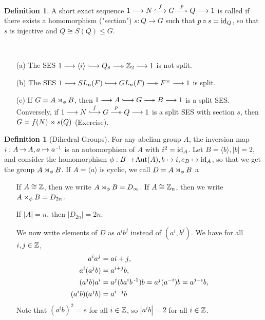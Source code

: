 \documentclass[11pt]{book}
\theoremstyle{definition}   \newtheorem{defn}[counter]{Definition} %
\newcommand{\gen}[1]{\langle #1 \rangle}   \newcommand{\stab}[2]{\tn{Stab}_{#1}(#2)}   \newcommand{\fix}[2]{\tn{Fix}_{#1}(#2)}
\newcommand{\hooklongrightarrow}{\lhook\joinrel\longrightarrow}   \newcommand{\twoheadlongrightarrow}{\relbar\joinrel\twoheadrightarrow}
\newcommand{\ses}[5]{1 \longrightarrow #1 \overset{#2}{\hooklongrightarrow} #3 \overset{#4}{\twoheadlongrightarrow} #5 \longrightarrow 1}
\DeclareMathOperator{\ra}{\rightarrow}   \DeclareMathOperator{\Poly}{\mathbf{P}}   \DeclareMathOperator{\spn}{\textnormal{span}}   \DeclareMathOperator{\aut}{\textnormal{Aut}}
\newcommand{\vs}{\vspace{8pt}}
\numberwithin{counter}{chapter}
\begin{document}
\vs

\begin{defn}
A short exact sequence $\ses{N}{f}{G}{p}{Q}$ is called  if there exists a homomorphism ("section") $s : Q \ra G$ such that $p \circ s = \textnormal{id}_Q$, so that $s$ is injective and $Q \cong S(Q) \leq G$.
\end{defn}

\vs

\begin{example*}
\
\begin{enumerate}
\item[(a)] The SES $\ses{\gen{i}}{}{Q_8}{}{\z_2}$ is not split.
\item[(b)] The SES $\ses{SL_n(F)}{}{GL_n(F)}{}{F\x}$ is split.
\item[(c)] If $G = A \rtimes_{\phi} B$, then $\ses{A}{}{G}{}{B}$ is a split SES. Conversely, if $\ses{N}{f}{G}{p}{Q}$ is a split SES with section $s$, then $G = f(N) \rtimes_{} s(Q)$ (Exercise).
\end{enumerate}
\end{example*}

\vs

\begin{defn}[Dihedral Groups]
For any abelian group $A$, the inversion map $i : A \ra A, a \mapsto a\inv$ is an automorphism of $A$ with $i^2 = \textnormal{id}_A$. Let $B = \gen{b}, |b|=2$, and consider the homomorphism $\phi : B \ra \aut(A), b \mapsto i, e_B \mapsto \id_A$, so that we get the group $A \rtimes_{\phi} B$. If $A = \gen{a}$ is cyclic, we call $D = A \rtimes_{\phi}B$ a 
\begin{enumerate}
\item[\tb{Notation.}] If $A \cong \operatorname{\mathbb{Z}}$, then we write $A \rtimes_{\phi}B = D_\infty$. If $A \cong \operatorname{\mathbb{Z}}_n$, then we write $A \rtimes_{\phi}B = D_{2n}$.
\item[\tb{Elements.}] If $|A| = n$, then $|D_{2n}| = 2n$.
\item[\tb{Multiplication.}] We now write elements of $D$ as $a^ib^j$ instead of $(a^i,b^j)$. We have for all $i,j \in \operatorname{\mathbb{Z}}$,
	\begin{align*}
	a^ia^j &= a{i+j}, \\
	a^i(a^jb) &= a^{i+j} b, \\
	(a^jb)a^i &= a^j(ba^ib\operatorname{^{-1}})b = a^j(a^{-i})b = a^{j-i}b, \\
	(a^ib)(a^jb) &= a^{i-j}b
	\end{align*}
Note that $(a^ib)^2 = e$ for all $i \in \operatorname{\mathbb{Z}}$, so $|a^ib| = 2$ for all $i \in \operatorname{\mathbb{Z}}$.
\end{enumerate}
\end{defn}
\end{document}
